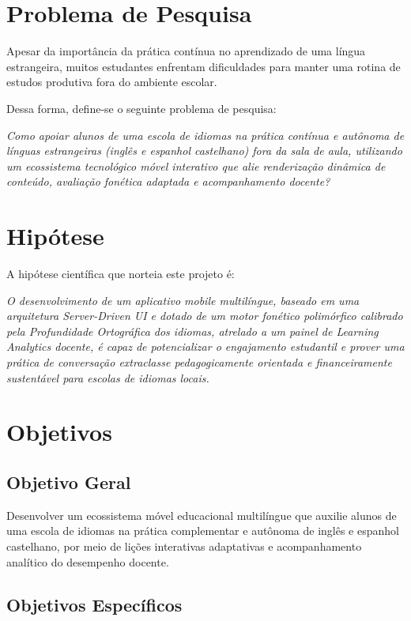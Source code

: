 \documentclass[portuguese]{sbcreviews-2025}%
\begin{document}
\section{Problema de Pesquisa}

Apesar da importância da prática contínua no aprendizado de uma língua estrangeira, muitos estudantes enfrentam dificuldades para manter uma rotina de estudos produtiva fora do ambiente escolar.

Dessa forma, define-se o seguinte problema de pesquisa:

\textit{Como apoiar alunos de uma escola de idiomas na prática contínua e autônoma de línguas estrangeiras (inglês e espanhol castelhano) fora da sala de aula, utilizando um ecossistema tecnológico móvel interativo que alie renderização dinâmica de conteúdo, avaliação fonética adaptada e acompanhamento docente?}

\section{Hipótese}

A hipótese científica que norteia este projeto é:

\textit{O desenvolvimento de um aplicativo mobile multilíngue, baseado em uma arquitetura Server-Driven UI e dotado de um motor fonético polimórfico calibrado pela Profundidade Ortográfica dos idiomas, atrelado a um painel de Learning Analytics docente, é capaz de potencializar o engajamento estudantil e prover uma prática de conversação extraclasse pedagogicamente orientada e financeiramente sustentável para escolas de idiomas locais.}

\section{Objetivos}

\subsection{Objetivo Geral}

Desenvolver um ecossistema móvel educacional multilíngue que auxilie alunos de uma escola de idiomas na prática complementar e autônoma de inglês e espanhol castelhano, por meio de lições interativas adaptativas e acompanhamento analítico do desempenho docente.

\subsection{Objetivos Específicos}
\end{document}
